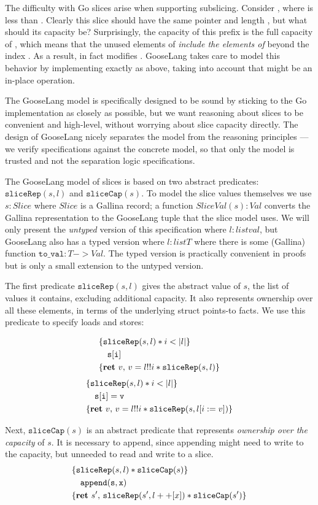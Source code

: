 The difficulty with Go slices arise when supporting subslicing. Consider
, where  is less than .
Clearly this slice should have the same pointer and length ,
but what should its capacity be? Surprisingly, the capacity of this
prefix is the full capacity of , which means that the unused
elements of  \emph{include the elements of }
beyond the index . As a result, 
in fact modifies . GooseLang takes care to model this
behavior by implementing  exactly as above, taking into
account that  might be an in-place operation.

The GooseLang model is specifically designed to be sound by sticking to
the Go implementation as closely as possible, but we want reasoning
about slices to be convenient and high-level, without worrying about
slice capacity directly. The design of GooseLang nicely separates the
model from the reasoning principles --- we verify specifications against
the concrete model, so that only the model is trusted and not the
separation logic specifications.

\newcommand{\sliceRep}{\mathtt{sliceRep}}
\newcommand{\sliceCap}{\mathtt{sliceCap}}

The GooseLang model of slices is based on two abstract predicates:
$\sliceRep(s, l)$ and $\sliceCap(s)$. To model the slice values
themselves we use $s : Slice$ where $Slice$ is a Gallina record; a
function $SliceVal(s) : Val$ converts the Gallina representation to
the GooseLang tuple that the slice model uses. We will only present the
\emph{untyped} version of this specification where $l : list val$, but
GooseLang also has a typed version where $l : list T$ where there is
some (Gallina) function $\mathtt{to\_val} : T -> Val$. The typed version is
practically convenient in proofs but is only a small extension to the
untyped version.

The first predicate $\sliceRep(s, l)$ gives the abstract value of
$s$, the list of values it contains, excluding additional capacity. It
also represents ownership over all these elements, in terms of the
underlying struct points-to facts. We use this predicate to specify
loads and stores:

\[
  \hoareV{\sliceRep(s, l) * i < |l|}%
{\mathtt{s[i]}}%
{\Ret{v} v = l !! i * \sliceRep(s, l)}
\]
\[
  \hoareV{\sliceRep(s, l) * i < |l|}%
 {\mathtt{s[i] = v}}%
{\Ret{v} v = l !! i * \sliceRep(s, l[i := v])}
\]

Next, $\sliceCap(s)$ is an abstract predicate that represents
\emph{ownership over the capacity} of $s$. It is necessary to append,
since appending might need to write to the capacity, but unneeded to
read and write to a slice.
\[
\hoareV{\sliceRep(s, l) * \sliceCap(s)}%
{\mathtt{append(s, x)}}%
{\Ret{s'} \sliceRep(s', l ++ [x]) * \sliceCap(s')}
\]

